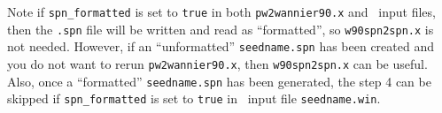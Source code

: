 Note if \texttt{spn\_formatted} is set to \texttt{true} in both 
\texttt{pw2wannier90.x} and \postw\ input files, then the \verb|.spn| file will 
be written and read as ``formatted'', so \texttt{w90spn2spn.x} is not needed. 
However, if an ``unformatted'' \verb|seedname.spn| has been created and 
you do not want to rerun \texttt{pw2wannier90.x}, then 
\texttt{w90spn2spn.x} can be useful. 
Also, once a ``formatted'' \verb|seedname.spn| has been generated, the step 4 can be skipped if 
\texttt{spn\_formatted} is set to \texttt{true} in \postw\ input file \verb|seedname.win|.